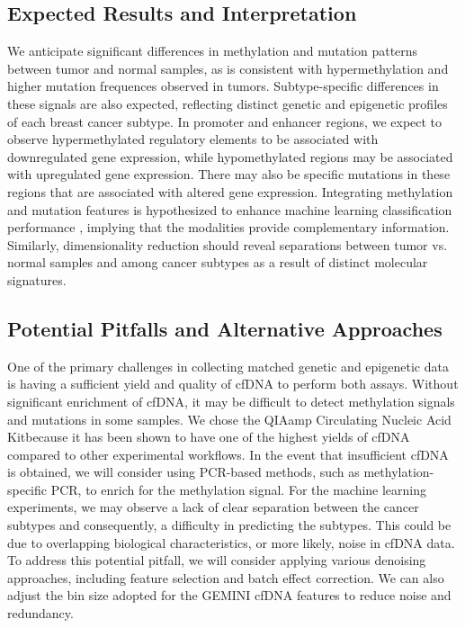 \documentclass[11pt]{article}
\begin{document}
\subsection*{Expected Results and Interpretation}
We anticipate significant differences in methylation and mutation patterns between tumor and normal samples, as is consistent with hypermethylation and higher mutation frequences observed in tumors.
Subtype-specific differences in these signals are also expected, reflecting distinct genetic and epigenetic profiles of each breast cancer subtype.
In promoter and enhancer regions, we expect to observe hypermethylated regulatory elements to be associated with downregulated gene expression, while hypomethylated regions may be associated with upregulated gene expression. There may also be specific mutations in these regions that are associated with altered gene expression.
Integrating methylation and mutation features is hypothesized to enhance machine learning classification performance \cite{moldovan_multi-modal_2024}, implying that the modalities provide complementary information. Similarly, dimensionality reduction should reveal separations between tumor vs. normal samples and among cancer subtypes as a result of distinct molecular signatures.


\subsection*{Potential Pitfalls and Alternative Approaches}
One of the primary challenges in collecting matched genetic and epigenetic data is having a sufficient yield and quality of cfDNA to perform both assays. 
Without significant enrichment of cfDNA, it may be difficult to detect methylation signals and mutations in some samples. 
We chose the QIAamp Circulating Nucleic Acid Kitbecause it has been shown to have one of the highest yields of cfDNA compared to other experimental workflows.\cite{polatoglou_isolation_2022}
In the event that insufficient cfDNA is obtained, we will consider using PCR-based methods, such as methylation-specific PCR, to enrich for the methylation signal. \cite{ku_methylation-specific_2011}
For the machine learning experiments, we may observe a lack of clear separation between the cancer subtypes and consequently, a difficulty in predicting the subtypes. This could be due to overlapping biological characteristics, or more likely, noise in cfDNA data.
To address this potential pitfall, we will consider applying various denoising approaches, including feature selection and batch effect correction. We can also adjust the bin size adopted for the GEMINI cfDNA features to reduce noise and redundancy.
\newpage



\nocite{*}
\end{document}
